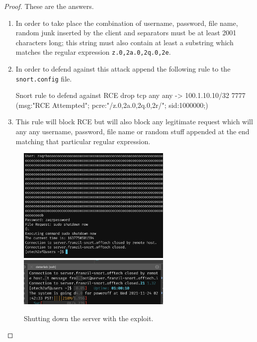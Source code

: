 \documentclass[a4paper,11pt,hidelinks]{article}
\begin{document}
\begin{proof}
    These are the answers.
    \begin{enumerate}
        \item In order to take place the combination of username, password, file name, random junk inserted by the client and separators must be at least 2001 characters long; this string must also contain at least a substring which matches the regular expression \texttt{z.{0,2}a.{0,2}q.{0,2}e}.
        \item In order to defend against this attack append the following rule to the \texttt{snort.config} file.
\begin{code}{Snort rule to defend against RCE}
drop tcp any any -> 100.1.10.10/32 7777
    (msg:"RCE Attempted"; pcre:"/z.{0,2}a.{0,2}q.{0,2}r/"; sid:1000000;)
\end{code}
        \item This rule will block RCE but will also block any legitimate request which will any any username, password, file name or random stuff appended at the end matching that particular regular expression.
    \end{enumerate}
    
    \begin{figure}[ht!]
        \centering
        \includegraphics[width=0.66\textwidth]{../drawable/shutdown-tentative.png}
        \includegraphics[width=0.66\textwidth]{../drawable/catastrophic-crash.png}
        \caption{Shutting down the server with the exploit.}
    \end{figure}
\end{proof}
\end{document}
